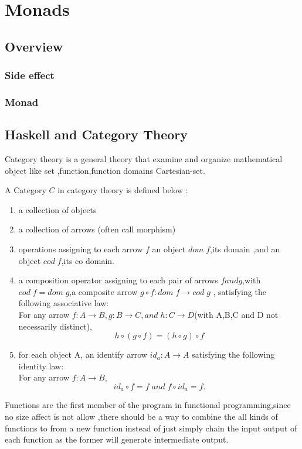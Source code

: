 \chapter{Monads}
\section{Overview}
\subsection{Side effect}


\subsection{Monad}








\section{Haskell and Category Theory}
Category theory is a general theory that examine and organize mathematical object like set ,function,function domains Cartesian-set.

A Category $C $ in category theory is defined below :
\begin{enumerate}
\item a collection of objects 
\item a collection of arrows (often call morphism) 
\item operations assigning to each arrow $f$ an object $dom\;f$,its domain ,and an object $cod\;f$,its co domain.
\item a composition operator assigning to each pair of arrows $f and g$,with $cod\;f = dom\;g$,a composite arrow $ g \circ f:dom\;f \rightarrow  cod\;g$ , satisfying the following associative law: \\
For any arrow $f: A \rightarrow B,g:B \rightarrow C,and\;h: C\rightarrow D$(with A,B,C and D not necessarily distinct),
$$h\circ (g\circ f) = (h\circ g)\circ f$$
\item for each object A, an identify arrow $id_{a}: A \rightarrow A$ satisfying the following identity law:\\
For any arrow $ f: A \rightarrow B,$ 
$$ id_{a} \circ f = f  \;and\;  f\circ id_{a} = f. $$
\end{enumerate}\cite{pierce_basic_1991}

Functions are the first member of the program in functional programming,since no size affect is not allow ,there should be a way to combine the all kinds of functions to from a new function instead of just simply chain the input output of each function as the former will generate intermediate output.


